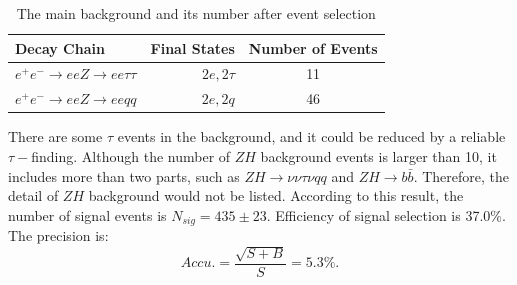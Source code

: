 \documentclass[11pt,a4paper]{cepcnote}
\begin{document}
\begin{table}[H]
	\begin{center}
		\begin{tabular}{lrc}
			\hline\hline
			Decay Chain	& Final States 	&	Number of Events	\\
			\hline
			$e^+e^-\to eeZ \to ee\tau\tau $ & $2e, 2\tau$	&	11\\
			$e^+e^-\to eeZ \to eeqq $ 		& $2e, 2q$		&	46\\
			\hline\hline
		\end{tabular}
		\caption[]{The main background and its number after event selection}
		\label{tab:bkgineeevqq}
	\end{center}
\end{table}
There are some $\tau$ events in the background, and it could be reduced by a reliable $\tau-$finding. 
Although the number of $ZH$ background events is larger than 10, it includes more than two parts, such as $ZH \to \nu\nu\tau\nu qq$
and $ZH \to b\bar{b}$. Therefore, the detail of $ZH$ background would not be listed.
According to this result, the number of signal events is $N_{sig} = 435\pm 23$. Efficiency of signal selection is 37.0\%. 
The precision is:
\begin{equation*}
	Accu. = \frac{\sqrt{S+B}}{S} = 5.3\%.
\end{equation*}
\end{document}
